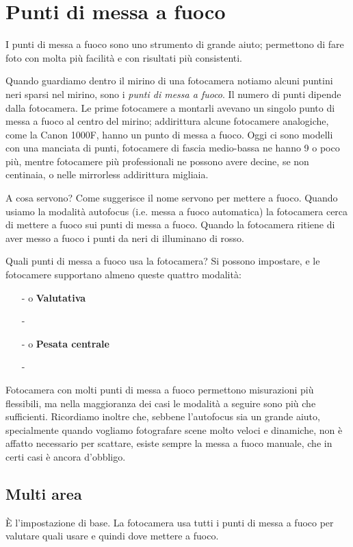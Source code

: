 \section{Punti di messa a fuoco} \label{sec:puntimessafuoco}
I punti di messa a fuoco sono uno strumento di grande aiuto; permettono di fare foto con molta più facilità e con risultati più consistenti.

Quando guardiamo dentro il mirino di una fotocamera notiamo alcuni puntini neri sparsi nel mirino, sono i \textit{punti di messa a fuoco}.
Il numero di punti dipende dalla fotocamera. Le prime fotocamere a montarli avevano un singolo punto di messa a fuoco al centro del mirino; addirittura alcune fotocamere analogiche, come la Canon 1000F, hanno un punto di messa a fuoco. Oggi ci sono modelli con una manciata di punti, fotocamere di fascia medio-bassa ne hanno 9 o poco più, mentre fotocamere più professionali ne possono avere decine, se non centinaia, o nelle mirrorless addirittura migliaia.

A cosa servono? Come suggerisce il nome servono per mettere a fuoco.
Quando usiamo la modalità autofocus (i.e. messa a fuoco automatica) la fotocamera cerca di mettere a fuoco sui punti di messa a fuoco.
Quando la fotocamera ritiene di aver messo a fuoco i punti da neri di illuminano di rosso.

Quali punti di messa a fuoco usa la fotocamera?\newline
Si possono impostare, e le fotocamere supportano almeno queste quattro modalità:
\begin{itemize}
    \item[-]  o \textbf{Valutativa}
    \item[-] 
    \item[-]  o \textbf{Pesata centrale}
    \item[-] 
\end{itemize}

Fotocamera con molti punti di messa a fuoco permettono misurazioni più flessibili, ma nella maggioranza dei casi le modalità a seguire sono più che sufficienti.
Ricordiamo inoltre che, sebbene l'autofocus sia un grande aiuto, specialmente quando vogliamo fotografare scene molto veloci e dinamiche, non è affatto necessario per scattare, esiste sempre la messa a fuoco manuale, che in certi casi è ancora d'obbligo.

\subsection{Multi area} \label{subsec:multiarea}
È l'impostazione di base. La fotocamera usa tutti i punti di messa a fuoco per valutare quali usare e quindi dove mettere a fuoco.

